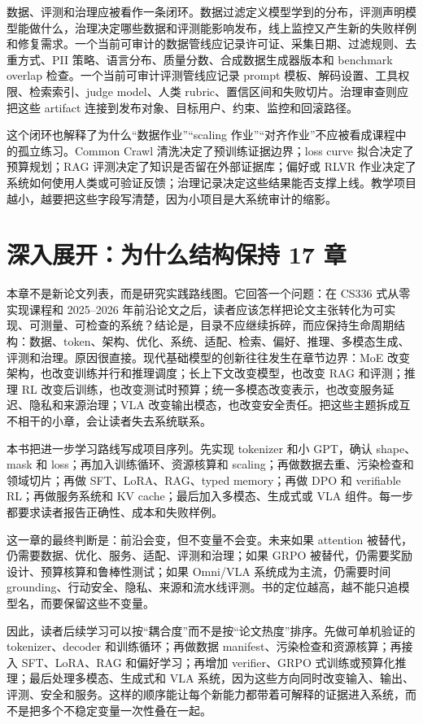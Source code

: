 \documentclass[UTF8,zihao=-4,openany]{ctexbook}
\begin{document}
数据、评测和治理应被看作一条闭环。数据过滤定义模型学到的分布，评测声明模型能做什么，治理决定哪些数据和评测能影响发布，线上监控又产生新的失败样例和修复需求。一个当前可审计的数据管线应记录许可证、采集日期、过滤规则、去重方式、PII 策略、语言分布、质量分数、合成数据生成器版本和 benchmark overlap 检查。一个当前可审计评测管线应记录 prompt 模板、解码设置、工具权限、检索索引、judge model、人类 rubric、置信区间和失败切片。治理审查则应把这些 artifact 连接到发布对象、目标用户、约束、监控和回滚路径。

这个闭环也解释了为什么“数据作业”“scaling 作业”“对齐作业”不应被看成课程中的孤立练习。Common Crawl 清洗决定了预训练证据边界；loss curve 拟合决定了预算规划；RAG 评测决定了知识是否留在外部证据库；偏好或 RLVR 作业决定了系统如何使用人类或可验证反馈；治理记录决定这些结果能否支撑上线。教学项目越小，越要把这些字段写清楚，因为小项目是大系统审计的缩影。

\section{深入展开：为什么结构保持 17 章}
本章不是新论文列表，而是研究实践路线图。它回答一个问题：在 CS336 式从零实现课程和 2025--2026 年前沿论文之后，读者应该怎样把论文主张转化为可实现、可测量、可检查的系统？结论是，目录不应继续拆碎，而应保持生命周期结构：数据、token、架构、优化、系统、适配、检索、偏好、推理、多模态生成、评测和治理。原因很直接。现代基础模型的创新往往发生在章节边界：MoE 改变架构，也改变训练并行和推理调度；长上下文改变模型，也改变 RAG 和评测；推理 RL 改变后训练，也改变测试时预算；统一多模态改变表示，也改变服务延迟、隐私和来源治理；VLA 改变输出模态，也改变安全责任。把这些主题拆成互不相干的小章，会让读者失去系统联系。

本书把进一步学习路线写成项目序列。先实现 tokenizer 和小 GPT，确认 shape、mask 和 loss；再加入训练循环、资源核算和 scaling；再做数据去重、污染检查和领域切片；再做 SFT、LoRA、RAG、typed memory；再做 DPO 和 verifiable RL；再做服务系统和 KV cache；最后加入多模态、生成式或 VLA 组件。每一步都要求读者报告正确性、成本和失败样例。

这一章的最终判断是：前沿会变，但不变量不会变。未来如果 attention 被替代，仍需要数据、优化、服务、适配、评测和治理；如果 GRPO 被替代，仍需要奖励设计、预算核算和鲁棒性测试；如果 Omni/VLA 系统成为主流，仍需要时间 grounding、行动安全、隐私、来源和流水线评测。书的定位越高，越不能只追模型名，而要保留这些不变量。

因此，读者后续学习可以按“耦合度”而不是按“论文热度”排序。先做可单机验证的 tokenizer、decoder 和训练循环；再做数据 manifest、污染检查和资源核算；再接入 SFT、LoRA、RAG 和偏好学习；再增加 verifier、GRPO 式训练或预算化推理；最后处理多模态、生成式和 VLA 系统，因为这些方向同时改变输入、输出、评测、安全和服务。这样的顺序能让每个新能力都带着可解释的证据进入系统，而不是把多个不稳定变量一次性叠在一起。
\end{document}
